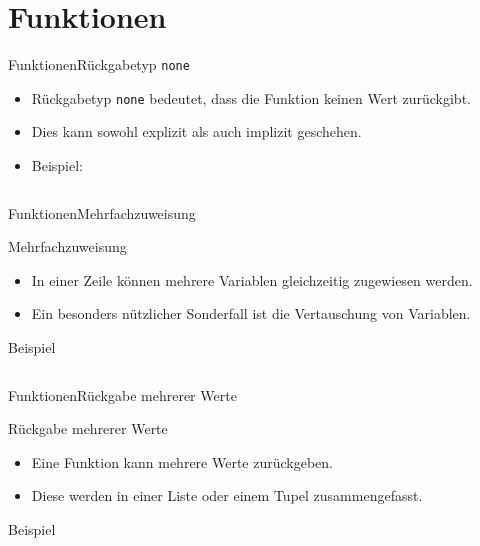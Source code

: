 \documentclass[xelatex,aspectratio=169]{beamer}
\begin{document}
\section{Funktionen}

\begin{frame}{Funktionen}{Rückgabetyp \texttt{none}}
    \begin{itemize}
        \item Rückgabetyp \texttt{none} bedeutet, dass die Funktion keinen Wert zurückgibt.
        \item Dies kann sowohl explizit als auch implizit geschehen.
        \item Beispiel:
              \inputminted{python}{src/functions_return_none.py}
    \end{itemize}
\end{frame}

\begin{frame}{Funktionen}{Mehrfachzuweisung}
    \begin{block}{Mehrfachzuweisung}
        \begin{itemize}
            \item In einer Zeile können mehrere Variablen gleichzeitig zugewiesen werden.
            \item Ein besonders nützlicher Sonderfall ist die Vertauschung von Variablen.
        \end{itemize}
    \end{block}
    \begin{exampleblock}
        {Beispiel}
        \inputminted[firstline=6]{python}{src/functions_multi_asign.py}
    \end{exampleblock}
\end{frame}

\begin{frame}{Funktionen}{Rückgabe mehrerer Werte}
    \vspace{-.3cm}
    \begin{block}{Rückgabe mehrerer Werte}
        \begin{itemize}
            \item Eine Funktion kann mehrere Werte zurückgeben.
            \item Diese werden in einer Liste oder einem Tupel zusammengefasst.
        \end{itemize}
    \end{block}
    \begin{exampleblock}
        {Beispiel}
        \inputminted[firstline=4, lastline=12]{python}{src/functions_multi_return.py}
    \end{exampleblock}

\end{frame}
\end{document}
